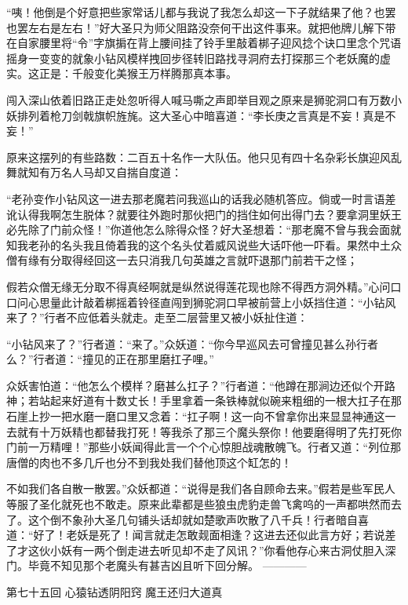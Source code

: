 \documentclass[12pt,UTF8]{ctexbook}
\begin{document}
“咦！他倒是个好意把些家常话儿都与我说了我怎么却这一下子就结果了他？也罢也罢左右是左右！”好大圣只为师父阻路没奈何干出这件事来。就把他牌儿解下带在自家腰里将“令”字旗掮在背上腰间挂了铃手里敲着梆子迎风捻个诀口里念个咒语摇身一变变的就象小钻风模样拽回步径转旧路找寻洞府去打探那三个老妖魔的虚实。这正是：千般变化美猴王万样腾那真本事。

闯入深山依着旧路正走处忽听得人喊马嘶之声即举目观之原来是狮驼洞口有万数小妖排列着枪刀剑戟旗帜旌旄。这大圣心中暗喜道：“李长庚之言真是不妄！真是不妄！”

原来这摆列的有些路数：二百五十名作一大队伍。他只见有四十名杂彩长旗迎风乱舞就知有万名人马却又自揣自度道：

“老孙变作小钻风这一进去那老魔若问我巡山的话我必随机答应。倘或一时言语差讹认得我啊怎生脱体？就要往外跑时那伙把门的挡住如何出得门去？要拿洞里妖王必先除了门前众怪！”你道他怎么除得众怪？好大圣想着：“那老魔不曾与我会面就知我老孙的名头我且倚着我的这个名头仗着威风说些大话吓他一吓看。果然中土众僧有缘有分取得经回这一去只消我几句英雄之言就吓退那门前若干之怪；

假若众僧无缘无分取不得真经啊就是纵然说得莲花现也除不得西方洞外精。”心问口口问心思量此计敲着梆摇着铃径直闯到狮驼洞口早被前营上小妖挡住道：“小钻风来了？”行者不应低着头就走。走至二层营里又被小妖扯住道：

“小钻风来了？”行者道：“来了。”众妖道：“你今早巡风去可曾撞见甚么孙行者么？”行者道：“撞见的正在那里磨扛子哩。”

众妖害怕道：“他怎么个模样？磨甚么扛子？”行者道：“他蹲在那涧边还似个开路神；若站起来好道有十数丈长！手里拿着一条铁棒就似碗来粗细的一根大扛子在那石崖上抄一把水磨一磨口里又念着：“扛子啊！这一向不曾拿你出来显显神通这一去就有十万妖精也都替我打死！等我杀了那三个魔头祭你！他要磨得明了先打死你门前一万精哩！”那些小妖闻得此言一个个心惊胆战魂散魄飞。行者又道：“列位那唐僧的肉也不多几斤也分不到我处我们替他顶这个缸怎的！

不如我们各自散一散罢。”众妖都道：“说得是我们各自顾命去来。”假若是些军民人等服了圣化就死也不敢走。原来此辈都是些狼虫虎豹走兽飞禽呜的一声都哄然而去了。这个倒不象孙大圣几句铺头话却就如楚歌声吹散了八千兵！行者暗自喜道：“好了！老妖是死了！闻言就走怎敢觌面相逢？这进去还似此言方好；若说差了才这伙小妖有一两个倒走进去听见却不走了风讯？”你看他存心来古洞仗胆入深门。毕竟不知见那个老魔头有甚吉凶且听下回分解。
------------

第七十五回 心猿钻透阴阳窍 魔王还归大道真
\end{document}
